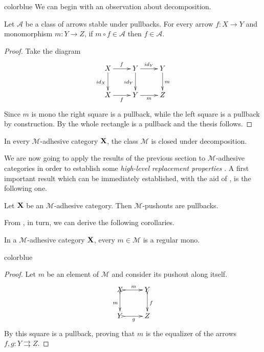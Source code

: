 \documentclass[a4paper,UKenglish,cleveref,pdftex, thm-restate,numberwithinsect,anonymous]{lipics}
\newcommand{\full}[1]{{color{blue}#1}}
\newcommand{\full}[1]{}
\newcommand{\id}[1]{\mathsf{id}_{#1}}
\def\X{\textbf {\textup{X}}}
\def\Y{\textbf {\textup{Y}}}
\begin{document}
\full{ 
We can begin with an observation about decomposition.

\begin{proposition}
  \label{prop:deco}Let $\mathcal{A}$ be a class of arrows stable under
  pullbacks. For every arrow $f\colon X\to Y$ and monomorphism
  $m\colon Y\to Z$, if $m\circ f \in\mathcal{A}$ then
  $f\in \mathcal{A}$.
\end{proposition}
\begin{proof}
  Take the diagram
  \[\xymatrix{X \ar[d]_{\id{X}}\ar[r]^{f}& Y \ar[r]^{\id{Y}}  \ar[d]_{\id{Y}}& Y \ar[d]^{m}\\
		X \ar[r]_{f}& Y \ar[r]_{m} & Z}\]
	Since $m$ is mono the right square is a pullback, while the left square is a pullback by construction. By \Cref{lem:pb1} the whole rectangle is a pullback and the thesis follows.
\end{proof}
\begin{corollary}
  \label{cor:deco}
	In every $\mathcal{M}$-adhesive category $\X$, the class $\mathcal{M}$ is closed under decomposition.
\end{corollary}}


We are now going to apply the results of the previous section to $\mathcal{M}$-adhesive categories in order to establish some \emph{high-level replacement properties} \cite{ehrig2004adhesive,ehrig2014adhesive,ehrig2006fundamentals}.  
A first important  result which can be immediately established, with the aid of , is the following one.

\begin{proposition}
	\label{prop:pbpoad}
	Let $\X$ be an $\mathcal{M}$-adhesive category. Then
	$\mathcal{M}$-pushouts are pullbacks.
\end{proposition}

From , in turn, we can derive the following corollaries.
\begin{corollary}\label{cor:rego}
	In a $\mathcal{M}$-adhesive category $\X$, every $m\in\mathcal{M}$ is a regular mono.
\end{corollary}
\full{ 
\begin{proof}
	Let $m$ be an element of $\mathcal{M}$ and consider its pushout along itself.
	\[\xymatrix{X\ar@{>->}[r]^m \ar@{>->}[d]_m& Y\ar@{>->}[d]^{f}\\Y \ar@{>->}[r]_g & Z}\]
	By \Cref{prop:pbpoad} this square is a pullback, proving that $m$ is the equalizer of the arrows $f,g\colon Y\rightrightarrows Z$.
\end{proof}}
\end{document}

